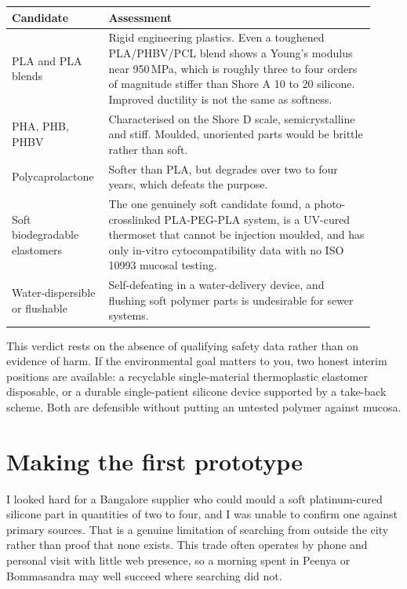 \documentclass[11pt]{article}
\begin{document}
\vspace{0.4em}
\begin{center}
\small
\begin{tabular}{@{}p{0.22\linewidth}p{0.70\linewidth}@{}}
\toprule
\textbf{Candidate} & \textbf{Assessment} \\
\midrule
PLA and PLA blends & Rigid engineering plastics. Even a toughened PLA/PHBV/PCL blend shows a Young's modulus near 950\,MPa, which is roughly three to four orders of magnitude stiffer than Shore A 10 to 20 silicone. Improved ductility is not the same as softness. \\
\addlinespace
PHA, PHB, PHBV & Characterised on the Shore D scale, semicrystalline and stiff. Moulded, unoriented parts would be brittle rather than soft. \\
\addlinespace
Polycaprolactone & Softer than PLA, but degrades over two to four years, which defeats the purpose. \\
\addlinespace
Soft biodegradable elastomers & The one genuinely soft candidate found, a photo-crosslinked PLA-PEG-PLA system, is a UV-cured thermoset that cannot be injection moulded, and has only in-vitro cytocompatibility data with no ISO 10993 mucosal testing. \\
\addlinespace
Water-dispersible or flushable & Self-defeating in a water-delivery device, and flushing soft polymer parts is undesirable for sewer systems. \\
\bottomrule
\end{tabular}
\end{center}
\vspace{0.6em}

\noindent This verdict rests on the absence of qualifying safety data rather than on evidence of harm. If the environmental goal matters to you, two honest interim positions are available: a recyclable single-material thermoplastic elastomer disposable, or a durable single-patient silicone device supported by a take-back scheme. Both are defensible without putting an untested polymer against mucosa.

\section{Making the first prototype}

I looked hard for a Bangalore supplier who could mould a soft platinum-cured silicone part in quantities of two to four, and I was unable to confirm one against primary sources. That is a genuine limitation of searching from outside the city rather than proof that none exists. This trade often operates by phone and personal visit with little web presence, so a morning spent in Peenya or Bommasandra may well succeed where searching did not.
\end{document}
